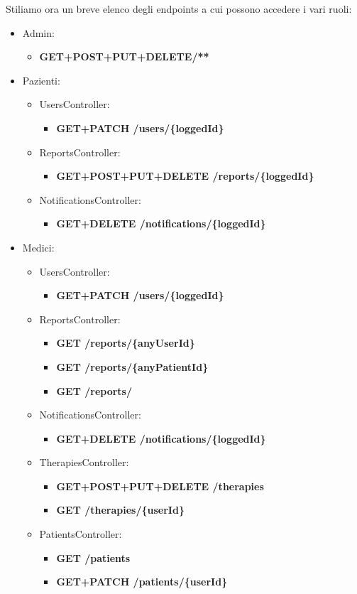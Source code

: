 \documentclass[a4paper]{article}
\begin{document}
Stiliamo ora un breve elenco degli endpoints a cui possono accedere i vari ruoli:
\begin{itemize}
  \item Admin:
  \begin{itemize}
    \item \textbf{GET+POST+PUT+DELETE/**}
  \end{itemize}
  \item Pazienti:
  \begin{itemize}
    \item UsersController: 
    \begin{itemize}
      \item \textbf{GET+PATCH /users/\{loggedId\}}
    \end{itemize}
    \item ReportsController: \begin{itemize}
      \item \textbf{GET+POST+PUT+DELETE /reports/\{loggedId\}}
    \end{itemize}
    \item NotificationsController: 
    \begin{itemize}
      \item \textbf{GET+DELETE /notifications/\{loggedId\}}
    \end{itemize}
  \end{itemize}
  \item Medici:
  \begin{itemize}
    \item UsersController:
    \begin{itemize}
      \item \textbf{GET+PATCH /users/\{loggedId\}} 
    \end{itemize}
    \item ReportsController:
    \begin{itemize}
      \item \textbf{GET /reports/\{anyUserId\}}
      \item \textbf{GET /reports/\{anyPatientId\}}
      \item \textbf{GET /reports/}
    \end{itemize}
    \item NotificationsController:
    \begin{itemize}
      \item \textbf{GET+DELETE /notifications/\{loggedId\}}
    \end{itemize}
    \item TherapiesController:
    \begin{itemize}
      \item \textbf{GET+POST+PUT+DELETE /therapies}
      \item \textbf{GET /therapies/\{userId\}}
    \end{itemize}
    \item PatientsController:
    \begin{itemize}
      \item \textbf{GET /patients}
      \item \textbf{GET+PATCH /patients/\{userId\}}
    \end{itemize}
  \end{itemize}
\end{itemize}
\end{document}
